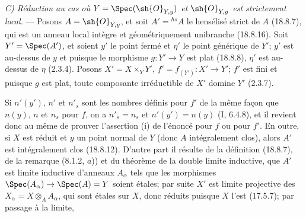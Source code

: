 \emph{C) Réduction au cas où $Y=\Spec(\sh{O}_{Y,y})$ et $\sh{O}_{Y,y}$ est strictement local.} --- Posons $A=\sh{O}_{Y,y}$, et soit $A'={}^{hs}\!A$ le hensélisé strict de $A$ (18.8.7), qui est un anneau local intègre et géométriquement unibranche (18.8.16). Soit $Y'=\Spec(A')$, et soient $y'$ le point fermé et $\eta'$ le point générique de $Y'$; $y'$ est au-dessus de $y$ et puisque le morphisme $g:Y'\to Y$ est plat (18.8.8), $\eta'$ est au-dessus de $\eta$ (2.3.4). Posons $X'=X\times_Y Y'$, $f'=f_{(Y')}:X'\to Y'$; $f'$ est fini et puisque $g$ est plat, toute composante irréductible de $X'$ domine $Y'$ (2.3.7).

Si $n'(y')$, $n'$ et $n'_s$ sont les nombres définis pour $f'$ de la même façon que $n(y)$, $n$ et $n_s$ pour $f$, on a $n'_s=n_s$ et $n'(y')=n(y)$ (I, 6.4.8), et il revient donc au même de prouver l'assertion (i) de l'énoncé pour $f$ ou pour $f'$. En outre, si $X$ est réduit et $y$ un point normal de $Y$ (donc $A$ intégralement clos), alors $A'$ est intégralement clos (18.8.12). D'autre part il résulte de la définition (18.8.7), de la remarque (8.1.2, $a$)) et du théorème de la double limite inductive, que $A'$ est limite inductive d'anneaux $A_\alpha$ tels que les morphismes $\Spec(A_\alpha)\to\Spec(A)=Y$ soient étales; par suite $X'$ est limite projective des $X_\alpha=X\otimes_A A_\alpha$, qui sont étales sur $X$, donc réduits puisque $X$ l'est (17.5.7); par passage à la limite,

